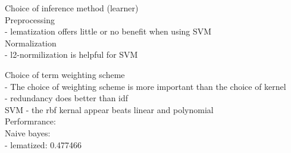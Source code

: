 \documentclass[letterpaper]{article}
\begin{document}
Choice of inference method (learner) \\

Preprocessing \\
- lematization offers little or no benefit when using SVM 
	\cite{leopold2002text}\\

Normalization \\
- l2-normilization is helpful for SVM \cite{leopold2002text}

Choice of term weighting scheme \\ 
- The choice of weighting scheme is more important than the choice
	of kernel \cite{leopold2002text}\\
- redundancy does better than idf\cite{leopold2002text} \\

SVM
- the rbf kernal appear beats linear and polynomial \cite{leopold2002text} \\

Performrance:\\
Naive bayes:\\
	- lematized: 0.477466



\end{document}
